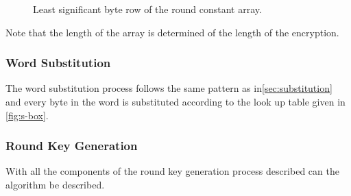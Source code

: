 \documentclass[report.tex]{subfiles}
\begin{document}
\begin{figure}[ht]
\setlength{\unitlength}{1.0cm}
	\begin{center}
	\end{center}
	\caption{Least significant byte row of the round constant array.}
	\label{fig:round constant array}
\end{figure}
Note that the length of the array is determined of the length of the encryption.

\subsubsection{Word Substitution}
	The word substitution process follows the same pattern as in\ref{sec:substitution} and every byte in the word is substituted according to the look up table given in \ref{fig:s-box}.
	
\subsubsection{Round Key Generation}
	With all the components of the round key generation process described can the algorithm be described.
\end{document}
